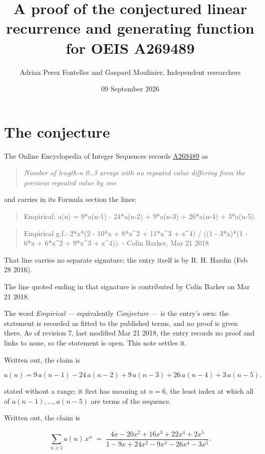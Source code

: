\documentclass[11pt]{article}
\title{A proof of the conjectured linear recurrence and generating function for OEIS A269489}
\author{Adrian Perez Fontelles and Gaspard Moulinier, Independent researchers}
\date{09 September 2026}
\theoremstyle{definition}
\begin{document}
\maketitle
\section{The conjecture}

The Online Encyclopedia of Integer Sequences records \href{https://oeis.org/A269489}{A269489} as

\begin{quote}\itshape Number of length-n 0..3 arrays with no repeated value differing from the previous repeated value by one\end{quote}

and carries in its Formula section the lines:

\begin{quote}\ttfamily Empirical: a(n) = 9*a(n-1) - 24*a(n-2) + 9*a(n-3) + 26*a(n-4) + 3*a(n-5).\end{quote}

\begin{quote}\ttfamily Empirical g.f.: 2*x*(2 - 10*x + 8*x\textasciicircum{}2 + 11*x\textasciicircum{}3 + x\textasciicircum{}4) / ((1 - 3*x)*(1 - 6*x + 6*x\textasciicircum{}2 + 9*x\textasciicircum{}3 + x\textasciicircum{}4)). - Colin Barker, Mar 21 2018\end{quote}

That line carries no separate signature; the entry itself is by R. H. Hardin (Feb 28 2016).

The line quoted ending in that signature is contributed by Colin Barker on Mar 21 2018.

The word {\itshape Empirical} --- equivalently {\itshape Conjecture} --- is the entry's own: the statement is recorded as fitted to the published terms, and no proof is given there. As of revision 7, last modified Mar 21 2018, the entry records no proof and links to none, so the statement is open. This note settles it.

Written out, the claim is

\[a(n) = 9\,a(n-1) - 24\,a(n-2) + 9\,a(n-3) + 26\,a(n-4) + 3\,a(n-5).\]

stated without a range; it first has meaning at $n = 6$, the least index at which all of $a(n-1),\dots,a(n-5)$ are terms of the sequence.

Written out, the claim is

\[\sum_{n \ge 1} a(n)\,x^n \;=\; \frac{4x - 20x^{2} + 16x^{3} + 22x^{4} + 2x^{5}}{1 - 9x + 24x^{2} - 9x^{3} - 26x^{4} - 3x^{5}}.\]
\end{document}
